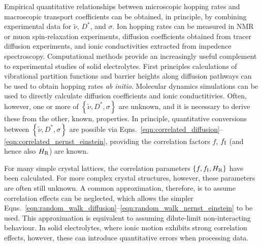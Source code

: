 \documentclass[aps,prb,twocolumn,superscriptaddress,reprint]{revtex4-1}
\newcommand{\set}[1]{\left\{#1\right\}}
\newcommand{\hrpa}{{\widetilde{\nu}}}
\begin{document}
Empirical quantitative relationships between microscopic hopping rates and macroscopic transport coefficients can be obtained, in principle, by combining experimental data for $\hrpa$, $D^*$, and $\sigma$. 
Ion hopping rates can be measured in NMR or muon spin-relaxation experiments,\cite{WilkeningEtAl_PhysRevLett2006, RuprechtEtAl_PhysChemChemPhys2012, Enciso-MaldonadoEtAl_ChemMater2015,Santibanez-MendietaEtAl_ChemMater2016, NozakiEtAl_SolStatIonics2014,AmoresEtAl_JMaterChemA2016} diffusion coefficients obtained from tracer diffusion experiments,\cite{BaylissEtAl_AdvEnergyMater2014} and ionic conductivities extracted from impedence spectroscopy.\cite{ZeierEtAl_ACSApplMaterInt2014,Lopez-BermudezEtAl_2016} Computational methods provide an increasingly useful complement to experimental studies of solid electrolytes. 
First principles calculations of vibrational partition functions and barrier heights along diffusion pathways can be used to obtain hopping rates \emph{ab initio}.\cite{VanDerVenEtAl_PhysRevB2001, MantinaEtAl_PhysRevLett2008} Molecular dynamics simulations can be used to directly calculate diffusion coefficients and ionic conductitivies.\cite{MorganAndMadden_JPhysCondensMat2012} Often, however, one or more of $\set{\hrpa,D^*,\sigma}$ are unknown, and it is necessary to derive these from the other, known, properties. In principle, quantitative conversions between $\set{\hrpa,D^*,\sigma}$ are possible via Eqns.~\ref{eqn:correlated_diffusion}--\ref{eqn:correlated_nernst_einstein}, providing the correlation factors $f$, $f_{\mathrm{I}}$ (and hence also $H_{\mathrm{R}}$) are known.

For many simple crystal lattices, the correlation parameters $\set{f, f_\m{I}, H_\m{R}}$ have been calculated.\cite{Friauf_JApplPhys1962,Murch_SolStatIonics1982} For more complex crystal structures, however, these parameters are often still unknown. A common approximation, therefore, is to assume correlation effects can be neglected, which allows the simpler Eqns.~\ref{eqn:random_walk_diffusion}--\ref{eqn:random_walk_nernst_einstein} to be used. This approximation is equivalent to assuming dilute-limit non-interacting behaviour. In solid electrolytes, where ionic motion exhibits strong correlation effects, however, these can introduce quantitative errors when processing data.
\end{document}
